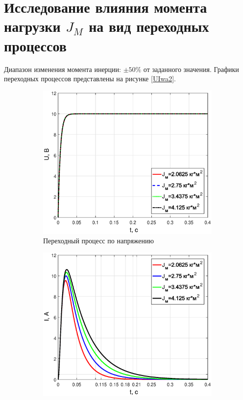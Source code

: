 \documentclass[12pt,a4paper]{article}
\begin{document}
\newpage
\section{Исследование влияния момента нагрузки $J_M$ на вид переходных процессов}
Диапазон изменения момента инерции: $\pm 50\%$  от заданного значения. Графики переходных процессов представлены на рисунке \ref{UIwa2}.
\begin{figure}[H]
	\centering
	\begin{subfigure}[b]{0.48\textwidth}
	    \includegraphics[width = \textwidth]{U2}
		\caption{Переходный процесс по напряжению}
	\end{subfigure}
	\hfill
	\begin{subfigure}[b]{0.48\textwidth}
		\includegraphics[width = \textwidth]{I2}

\end{subfigure}
\end{figure}
\end{document}
